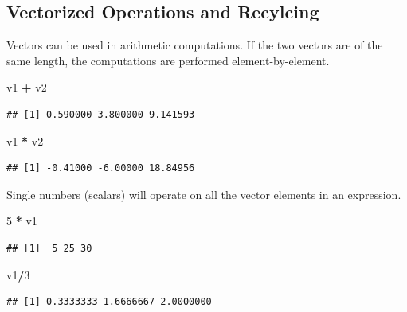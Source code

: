 \documentclass[
]{book}
\newenvironment{Shaded}{\begin{snugshade}}{\end{snugshade}}
\newcommand{\DecValTok}[1]{\textcolor[rgb]{0.00,0.00,0.81}{#1}}
\newcommand{\NormalTok}[1]{#1}
\newcommand{\OperatorTok}[1]{\textcolor[rgb]{0.81,0.36,0.00}{\textbf{#1}}}
\newcommand{\StringTok}[1]{\textcolor[rgb]{0.31,0.60,0.02}{#1}}
\begin{document}
\hypertarget{vectorized-operations-and-recylcing}{%
\subsection{Vectorized Operations and Recylcing}\label{vectorized-operations-and-recylcing}}

Vectors can be used in arithmetic computations. If the two vectors are of the same length, the computations are performed element-by-element.

\begin{Shaded}
\begin{Highlighting}[]
\NormalTok{v1 }\OperatorTok{+}\StringTok{ }\NormalTok{v2}
\end{Highlighting}
\end{Shaded}

\begin{verbatim}
## [1] 0.590000 3.800000 9.141593
\end{verbatim}

\begin{Shaded}
\begin{Highlighting}[]
\NormalTok{v1 }\OperatorTok{*}\StringTok{ }\NormalTok{v2}
\end{Highlighting}
\end{Shaded}

\begin{verbatim}
## [1] -0.41000 -6.00000 18.84956
\end{verbatim}

Single numbers (scalars) will operate on all the vector elements in an expression.

\begin{Shaded}
\begin{Highlighting}[]
\DecValTok{5} \OperatorTok{*}\StringTok{ }\NormalTok{v1}
\end{Highlighting}
\end{Shaded}

\begin{verbatim}
## [1]  5 25 30
\end{verbatim}

\begin{Shaded}
\begin{Highlighting}[]
\NormalTok{v1}\OperatorTok{/}\DecValTok{3}
\end{Highlighting}
\end{Shaded}

\begin{verbatim}
## [1] 0.3333333 1.6666667 2.0000000
\end{verbatim}
\end{document}
